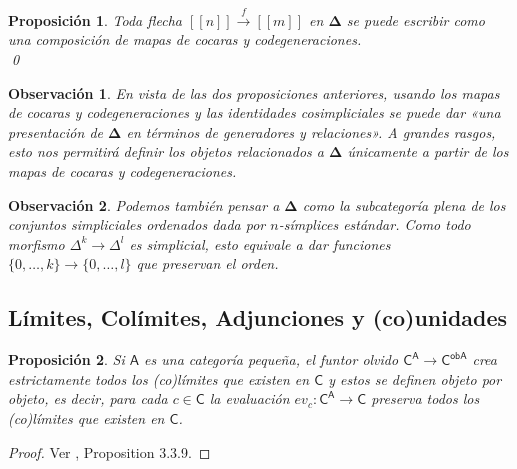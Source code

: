 \documentclass[11pt]{report}
\theoremstyle{colored}
\newtheorem{proposition}{Proposición}[section]
\newtheorem{remark}{Observación}[section]
\newcommand{\nat}[1]{[\![#1]\!]}
\newcommand{\ord}[1]{\nat{#1}}
\newcommand{\cat}[1]{\mathsf{#1}}
\renewcommand{\ss}[1]{\Delta^{#1}}
\newcommand{\ordcat}{\boldsymbol{\Delta}}
\begin{document}
\begin{proposition} Toda flecha $\ord{n} \xrightarrow{f} \ord{m}$ en $\ordcat$ se puede escribir como una composición de mapas de cocaras y codegeneraciones. \\ \qed
\end{proposition}

\begin{remark} En vista de las dos proposiciones anteriores,  usando los mapas de cocaras y codegeneraciones y las identidades cosimpliciales se puede dar «una presentación de $\ordcat$ en términos de generadores y relaciones». A grandes rasgos, esto nos permitirá definir los objetos relacionados a $\ordcat$ únicamente a partir de los mapas de cocaras y codegeneraciones.
\end{remark}

\begin{remark} Podemos también pensar a $\ordcat$ como la subcategoría plena de los conjuntos simpliciales ordenados dada por $n$-símplices estándar. Como todo morfismo $\ss{k} \to \ss{l}$ es simplicial, esto equivale a dar funciones $\{0,\dots,k\} \to \{0,\dots,l\}$ que preservan el orden.
\end{remark}

\subsection{Límites, Colímites, Adjunciones y (co)unidades}

\begin{proposition}\label{(co)limites-lugar-a-lugar} Si $\cat{A}$ es una categoría pequeña, el funtor olvido $\cat{C}^\cat{A} \to \cat{C}^\cat{ob A}$ crea estrictamente todos los (co)límites que existen en $\cat{C}$ y estos se definen objeto por objeto, es decir, para cada $c \in \cat{C}$ la evaluación $ev_c : \cat{C}^\cat{A} \to \cat{C}$ preserva todos los (co)límites que existen en $\cat{C}$.
\end{proposition}
\begin{proof} Ver \cite{ct-context}, Proposition 3.3.9.
\end{proof}
\end{document}
